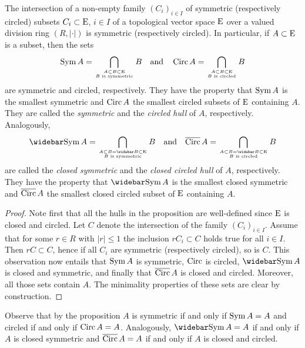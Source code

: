 \begin{propanddef}\label{thm:symmetric-circled-hulls}
  The intersection of a non-empty family $(C_i)_{i\in I}$ of symmetric (respectively circled) subsets $C_i \subset \mathrm{E}$, $i\in I$
  of a topological vector space $\mathrm{E}$ over a valued division ring $(R,|\cdot|)$
  is symmetric (respectively circled).
  In particular, if $A \subset \mathrm{E}$ is a subset, then the sets
  \[
    \operatorname{Sym} A = \bigcap\limits_{A \subset B \subset \mathrm{E} \atop {B \text{ is symmetric}} }  B \quad \text{and} \quad
    \operatorname{Circ} A = \bigcap\limits_{A \subset B \subset \mathrm{E} \atop {B \text{ is circled}} }  B 
  \]
  are symmetric and circled, respectively.   They have the property that
  $\operatorname{Sym} A$ is the smallest symmetric and $\operatorname{Circ} A$ the smallest circled subsets of $\mathrm{E}$ containing $A$.
  They are called the \emph{symmetric} and the \emph{circled hull} of $A$, respectively.
  Analogously,
  \[
    \clsymHull A = \bigcap\limits_{A \subset B =\closure{B} \subset \vectorspE \atop {B \text{ is symmetric}} }  B \quad \text{and} \quad
    \clcircHull A = \bigcap\limits_{A \subset B  =\closure{B}  \subset \vectorspE \atop {B \text{ is circled}} }  B 
  \]
  are called the \emph{closed symmetric} and the \emph{closed circled hull} of $A$, respectively.
  They have the property that $\clsymHull A$ is the smallest closed symmetric and $\overline{\operatorname{Circ}}\, A$ the smallest closed
  circled subset of $\mathrm{E}$ containing $A$.
\end{propanddef}
\begin{proof}
  Note first that all the hulls in the proposition are well-defined since $\mathrm{E}$ is
  closed and circled. 
  Let $C$ denote the intersection of the family $(C_i)_{i\in I}$. Assume that for some $r\in R$ with $|r|\leq 1$
  the inclusion $rC_i \subset C$ holds true for all  $i\in I$. Then $rC \subset C$, hence if all
  $C_i$ are symmetric (respectively circled), so is $C$.
  This observation now entails that $\operatorname{Sym} A$ is symmetric, $\operatorname{Circ}$ is circled, $\clsymHull A$ is closed
  and symmetric, and finally that $\overline{\operatorname{Circ}}\, A$ is closed and circled. Moreover, all those sets contain $A$.
  The minimality properties of these sets are clear by construction.  
\end{proof}

\begin{remark}
  Observe that by the proposition $A$ is symmetric if and only if $\operatorname{Sym} A = A$ and
  circled if and only if $\operatorname{Circ} A = A$. Analogously,
  $\clsymHull A = A$ if and only if $A$ is closed symmetric and
  $\overline{\operatorname{Circ}}\, A = A$ if and only if $A$ is closed and circled. 
\end{remark}



